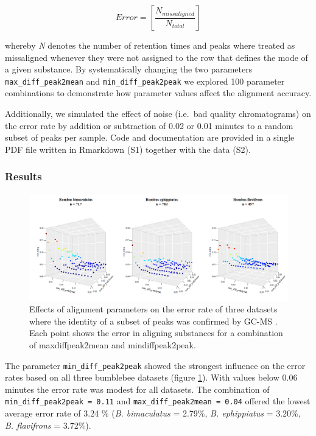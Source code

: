 \begin{equation}
Error = \left[\frac{N_{missaligned}}{N_{total}}\right] 
\end{equation}

whereby \emph{N} denotes the number of retention times and peaks where
treated as missaligned whenever they were not assigned to the row that
defines the mode of a given substance. By systematically changing the
two parameters \texttt{max\_diff\_peak2mean} and
\texttt{min\_diff\_peak2peak} we explored 100 parameter combinations to
demonstrate how parameter values affect the alignment accuracy. \par
Additionally, we simulated the effect of noise (i.e.~bad quality
chromatograms) on the error rate by addition or subtraction of 0.02 or
0.01 minutes to a random subset of peaks per sample. Code and
documentation are provided in a single PDF file written in Rmarkdown
(S1) together with the data (S2).

\subsubsection{Results}\label{results}

\begin{figure}[htbp]
\centering
\includegraphics[width=13cm]{figures/parameter_space}
\caption{Effects of alignment parameters on the error rate of three datasets where the identity of a subset of peaks was confirmed by GC-MS \citep{Dellicour.2013}. Each point shows the error in aligning substances for a combination of max\textunderscore diff\textunderscore peak2mean and min\textunderscore diff\textunderscore peak2peak.}
\label{figure:parameterspace}
\end{figure}

The parameter \texttt{min\_diff\_peak2peak} showed the strongest
influence on the error rates based on all three bumblebee datasets
(figure \ref{figure:parameterspace}). With values below 0.06 minutes the
error rate was modest for all datasets. The combination of
\texttt{min\_diff\_peak2peak\ =\ 0.11} and
\texttt{max\_diff\_peak2mean\ =\ 0.04} offered the lowest average error
rate of 3.24 \% (\emph{B. bimaculatus} = 2.79\%, \emph{B. ephippiatus} =
3.20\%, \emph{B. flavifrons} = 3.72\%).

